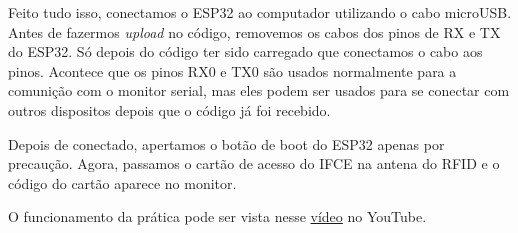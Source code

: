 \documentclass[12pt]{article}
\begin{document}
Feito tudo isso, conectamos o ESP32 ao computador utilizando o cabo microUSB. Antes de fazermos \textit{upload} no código, removemos os cabos dos pinos de RX e TX do ESP32. Só depois do código ter sido carregado que conectamos o cabo aos pinos. Acontece que os pinos RX0 e TX0 são usados normalmente para a comunição com o monitor serial, mas eles podem ser usados para se conectar com outros dispositos depois que o código já foi recebido.

Depois de conectado, apertamos o botão de boot do ESP32 apenas por precaução. Agora, passamos o cartão de acesso do IFCE na antena do RFID e o código do cartão aparece no monitor.

O funcionamento da prática pode ser vista nesse \href{https://youtu.be/eZHZmrigDyo}{vídeo} no YouTube.
\end{document}
